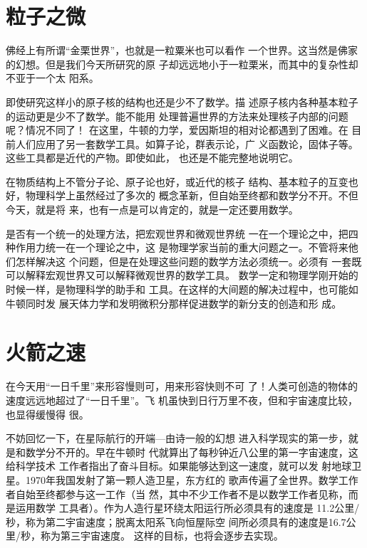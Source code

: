 \documentclass[twoside,openright,headings=optiontohead]{ctexbook} %
\begin{document}
{\section{粒子之微}\label{ux7c92ux5b50ux4e4bux5fae}

佛经上有所谓``金栗世界''，也就是一粒粟米也可以看作
一个世界。这当然是佛家的幻想。但是我们今天所研究的原
子却远远地小于一粒栗米，而其中的复杂性却不亚于一个太 阳系。

即使研究这样小的原子核的结构也还是少不了数学。描
述原子核内各种基本粒子的运动更是少不了数学。能不能用
处理普遍世界的方法来处理核子内部的问题呢？情况不同了！
在这里，牛顿的力学，爱因斯坦的相对论都遇到了困难。在
目前人们应用了另一套数学工具。如算子论，群表示论，广
义函数论，固体子等。这些工具都是近代的产物。即使如此，
也还是不能完整地说明它。

在物质结构上不管分子论、原子论也好，或近代的核子
结构、基本粒子的互变也好，物理科学上虽然经过了多次的
概念革新，但自始至终都和数学分不开。不但今天，就是将
来，也有一点是可以肯定的，就是一定还要用数学。

是否有一个统一的处理方法，把宏观世界和微观世界统
一在一个理论之中，把四种作用力统一在一个理论之中，这
是物理学家当前的重大问题之一。不管将来他们怎样解决这
个问题，但是在处理这些问题的数学方法必须统一。必须有
一套既可以解释宏观世界又可以解释微观世界的数学工具。
数学一定和物理学刚开始的时候一样，是物理科学的助手和
工具。在这样的大间题的解决过程中，也可能如牛顿同时发
展天体力学和发明微积分那样促进数学的新分支的创造和形 成。

\section{火箭之速}\label{ux706bux7badux4e4bux901f}

在今天用``一日千里''来形容慢则可，用来形容快则不可
了！人类可创造的物体的速度远远地超过了``一日千里''。飞
机虽快到日行万里不夜，但和宇宙速度比较，也显得缓慢得 很。

不妨回忆一下，在星际航行的开端---由诗一般的幻想
进入科学现实的第一步，就是和数学分不开的。早在牛顿时
代就算出了每秒钟近八公里的第一字宙速度，这给科学技术
工作者指出了奋斗目标。如果能够达到这一速度，就可以发
射地球卫星。1970年我国发射了第一颗人造卫星，东方红的
歌声传遍了全世界。数学工作者自始至终都参与这一工作（当
然，其中不少工作者不是以数学工作者见称，而是运用数学
工具者）。作为人造行星环绕太阳运行所必须具有的速度是
11.2公里/秒，称为第二宇宙速度；脱离太阳系飞向恒屋际空
间所必须具有的速度是16.7公里/秒，称为第三宇宙速度。
这样的目标，也将会逐步去实现。

}
\end{document}

